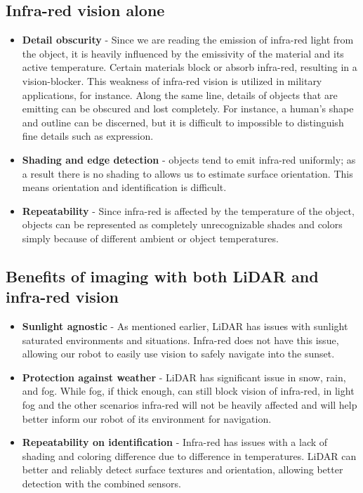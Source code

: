 \documentclass{article}
\begin{document}
\subsection*{Infra-red vision alone}

\begin{itemize}
    \item \textbf{Detail obscurity} - Since we are reading the emission of infra-red light from the object, it is heavily influenced by the emissivity of the material and its active temperature. Certain materials block or absorb infra-red, resulting in a vision-blocker. This weakness of infra-red vision is utilized in military applications, for instance. Along the same line, details of objects that are emitting can be obscured and lost completely. For instance, a human's shape and outline can be discerned, but it is difficult to impossible to distinguish fine details such as expression.
    \item \textbf{Shading and edge detection} - objects tend to emit infra-red uniformly; as a result there is no shading to allows us to estimate surface orientation. This means orientation and identification is difficult.
    \item \textbf{Repeatability} - Since infra-red is affected by the temperature of the object, objects can be represented as completely unrecognizable shades and colors simply because of different ambient or object temperatures.
\end{itemize}

\subsection*{Benefits of imaging with both LiDAR and infra-red vision}

\begin{itemize}
    \item \textbf{Sunlight agnostic} - As mentioned earlier, LiDAR has issues with sunlight saturated environments and situations. Infra-red does not have this issue, allowing our robot to easily use vision to safely navigate into the sunset.
    \item \textbf{Protection against weather} - LiDAR has significant issue in snow, rain, and fog. While fog, if thick enough, can still block vision of infra-red, in light fog and the other scenarios infra-red will not be heavily affected and will help better inform our robot of its environment for navigation.
    \item \textbf{Repeatability on identification} - Infra-red has issues with a lack of shading and coloring difference due to difference in temperatures. LiDAR can better and reliably detect surface textures and orientation, allowing better detection with the combined sensors.
\end{itemize}
\end{document}
